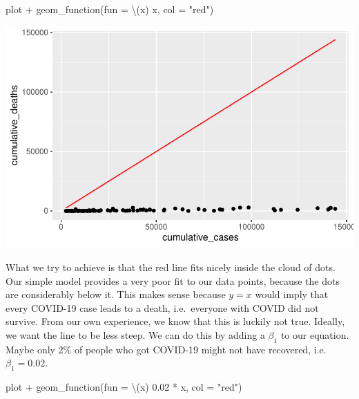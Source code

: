 \documentclass[
  letterpaper,
  DIV=11,
  numbers=noendperiod]{scrreprt}
\newenvironment{Shaded}{\begin{snugshade}}{\end{snugshade}}
\newcommand{\AttributeTok}[1]{\textcolor[rgb]{0.40,0.45,0.13}{#1}}
\newcommand{\FloatTok}[1]{\textcolor[rgb]{0.68,0.00,0.00}{#1}}
\newcommand{\FunctionTok}[1]{\textcolor[rgb]{0.28,0.35,0.67}{#1}}
\newcommand{\NormalTok}[1]{\textcolor[rgb]{0.00,0.23,0.31}{#1}}
\newcommand{\SpecialCharTok}[1]{\textcolor[rgb]{0.37,0.37,0.37}{#1}}
\newcommand{\StringTok}[1]{\textcolor[rgb]{0.13,0.47,0.30}{#1}}
\begin{document}
\begin{Shaded}
\begin{Highlighting}[]
\NormalTok{plot }\SpecialCharTok{+}
  \FunctionTok{geom\_function}\NormalTok{(}\AttributeTok{fun =}\NormalTok{ \textbackslash{}(x) x, }\AttributeTok{col =} \StringTok{"red"}\NormalTok{)}
\end{Highlighting}
\end{Shaded}

\includegraphics{13_regressions_files/figure-latex/fitting-model-by-hand-step-four-1.pdf}

What we try to achieve is that the red line fits nicely inside the cloud
of dots. Our simple model provides a very poor fit to our data points,
because the dots are considerably below it. This makes sense because
\(y = x\) would imply that every COVID-19 case leads to a death,
i.e.~everyone with COVID did not survive. From our own experience, we
know that this is luckily not true. Ideally, we want the line to be less
steep. We can do this by adding a \(\beta_1\) to our equation. Maybe
only 2\% of people who got COVID-19 might not have recovered,
i.e.~\(\beta_1 = 0.02\).

\begin{Shaded}
\begin{Highlighting}[]
\NormalTok{plot }\SpecialCharTok{+}
  \FunctionTok{geom\_function}\NormalTok{(}\AttributeTok{fun =}\NormalTok{ \textbackslash{}(x) }\FloatTok{0.02} \SpecialCharTok{*}\NormalTok{ x, }\AttributeTok{col =} \StringTok{"red"}\NormalTok{)}
\end{Highlighting}
\end{Shaded}
\end{document}
